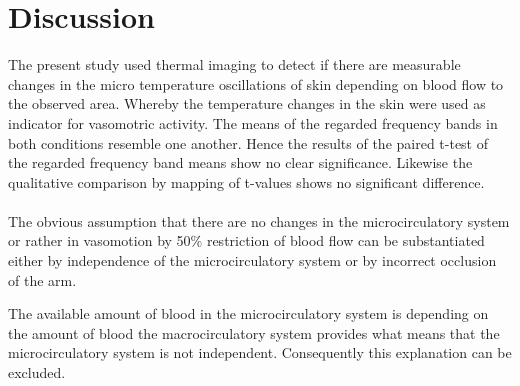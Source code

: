 \chapter{Discussion}

The present study used thermal imaging to detect if there are measurable changes in the micro temperature oscillations of skin depending on blood flow to the observed area. Whereby the temperature changes in the skin were used as indicator for vasomotric activity. %
The means of the regarded frequency bands in both conditions resemble one another. Hence the results of the paired t-test of the regarded frequency band means show no clear significance. Likewise the qualitative comparison by mapping of t-values shows no significant difference. %
\\
\\
The obvious assumption that there are no changes in the microcirculatory system or rather in vasomotion by 50\% restriction of blood flow can be substantiated either by independence of the microcirculatory system or by incorrect occlusion of the arm.

The available amount of blood in the microcirculatory system is depending on the amount of blood the macrocirculatory system provides what means that the microcirculatory system is not independent. Consequently this explanation can be excluded.

